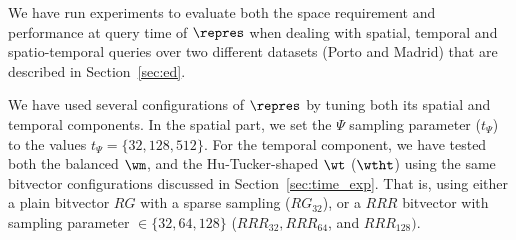 We have run experiments to evaluate both the space requirement and performance at query time of $\repres$
when dealing with spatial, temporal and spatio-temporal queries over two different datasets 
(Porto and Madrid) that are described in Section~\ref{sec:ed}. 

We have used several configurations of $\repres$ by tuning both its
spatial and temporal components. In the spatial part, %
we set the  $\Psi$ sampling parameter ($t_{\Psi}$) to the values $t_{\Psi} = \{32, 128, 512\}$. 
For the temporal component, %
we have tested both the 
balanced $\wm$, and the Hu-Tucker-shaped $\wt$ ($\wtht$) using the same bitvector configurations
discussed in Section~\ref{sec:time_exp}. That is, using either a plain bitvector $RG$ with a 
sparse sampling ($RG_{32}$), or a $RRR$ bitvector with sampling parameter $\in \{32,64,128\}$ 
($RRR_{32}, RRR_{64}$, and $ RRR_{128})$.



